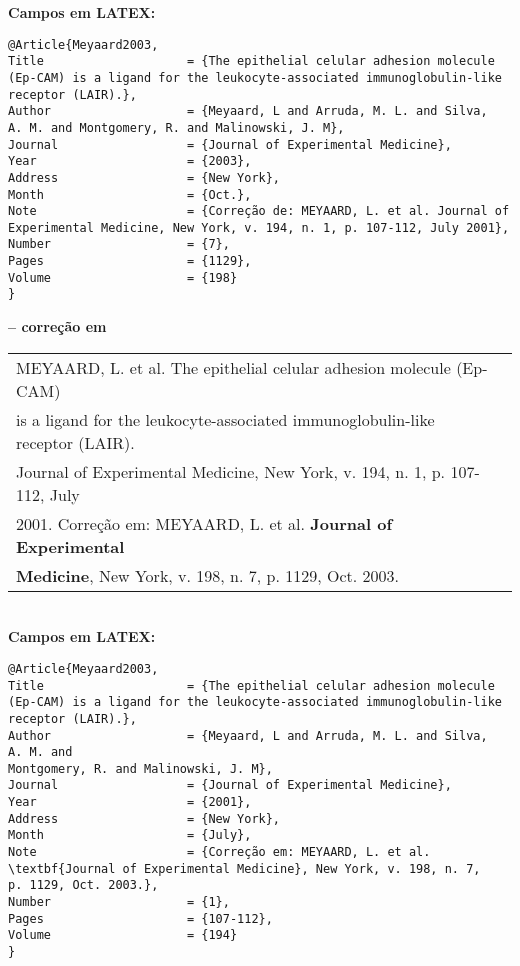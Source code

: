 \textbf{Campos em LATEX:} 
	
\begingroup
\fontsize{10pt}{12pt}\selectfont
\begin{verbatim}
@Article{Meyaard2003,
Title                    = {The epithelial celular adhesion molecule 
(Ep-CAM) is a ligand for the leukocyte-associated immunoglobulin-like 
receptor (LAIR).}, 
Author                   = {Meyaard, L and Arruda, M. L. and Silva, 
A. M. and Montgomery, R. and Malinowski, J. M},
Journal                  = {Journal of Experimental Medicine},
Year                     = {2003},
Address                  = {New York},
Month                    = {Oct.},
Note                     = {Correção de: MEYAARD, L. et al. Journal of 
Experimental Medicine, New York, v. 194, n. 1, p. 107-112, July 2001},
Number                   = {7},
Pages                    = {1129},
Volume                   = {198}
}
\end{verbatim}
\endgroup
	
\textbf{-- correção em} \\
	
\begin{tabular}{|l|c|} \hline
	MEYAARD, L. et al. The epithelial celular adhesion molecule (Ep-CAM) 
	                                                                     \\is a ligand for the leukocyte-associated immunoglobulin-like receptor
	(LAIR).                                                              \\Journal of Experimental Medicine, New York, v. 194, n. 1, p. 107-112, July \\2001. Correção em: MEYAARD, L. et al. \textbf{Journal of Experimental}\\ \textbf{Medicine}, New York, v. 198, n. 7, p. 1129, Oct. 2003. 
	                                                                     \\\hline
\end{tabular} \\
	
\textbf{Campos em LATEX:} 
	
\begingroup
\fontsize{10pt}{12pt}\selectfont
\begin{verbatim}
@Article{Meyaard2003,
Title                    = {The epithelial celular adhesion molecule 
(Ep-CAM) is a ligand for the leukocyte-associated immunoglobulin-like 
receptor (LAIR).},
Author                   = {Meyaard, L and Arruda, M. L. and Silva, 
A. M. and 
Montgomery, R. and Malinowski, J. M},
Journal                  = {Journal of Experimental Medicine},
Year                     = {2001},
Address                  = {New York},
Month                    = {July},
Note                     = {Correção em: MEYAARD, L. et al. 
\textbf{Journal of Experimental Medicine}, New York, v. 198, n. 7, 
p. 1129, Oct. 2003.},
Number                   = {1},
Pages                    = {107-112},
Volume                   = {194}
}
\end{verbatim}
\endgroup
	
